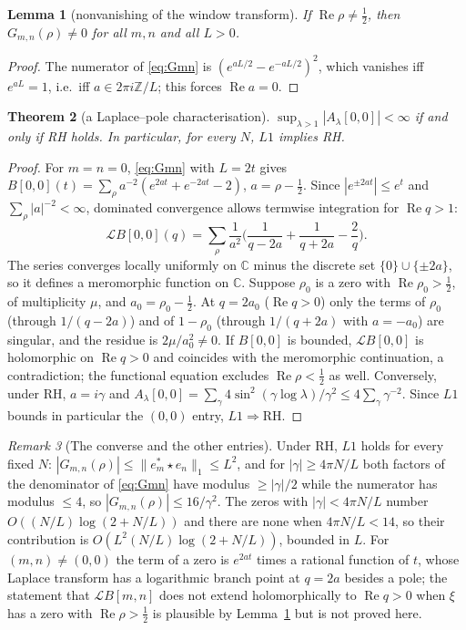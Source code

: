 \documentclass[11pt]{amsart}
\newtheorem{theorem}{Theorem}[section]
\newtheorem{lemma}[theorem]{Lemma}
\theoremstyle{definition}
\theoremstyle{remark}
\newtheorem{remark}[theorem]{Remark}
\newcommand{\RH}{\mathrm{RH}}
\renewcommand{\Re}{\operatorname{Re}}
\newcommand{\half}{\tfrac{1}{2}}
\newcommand{\gam}{\gamma}
\newcommand{\Z}{\mathbb{Z}}
\newcommand{\C}{\mathbb{C}}
\begin{document}
\begin{lemma}[nonvanishing of the window transform]\label{lem:pw}
If $\Re\rho\neq\half$, then $G_{m,n}(\rho)\neq0$ for all $m,n$ and all $L>0$.
\end{lemma}
\begin{proof}
The numerator of \eqref{eq:Gmn} is $(e^{aL/2}-e^{-aL/2})^2$, which vanishes iff $e^{aL}=1$, i.e.\
iff $a\in2\pi i\Z/L$; this forces $\Re a=0$.
\end{proof}

\begin{theorem}[a Laplace--pole characterisation]\label{thm:L1}
$\sup_{\lambda>1}|A_\lambda[0,0]|<\infty$ if and only if RH holds. In particular, for every $N$,
$L1$ implies RH.
\end{theorem}
\begin{proof}
For $m=n=0$, \eqref{eq:Gmn} with $L=2t$ gives
$B[0,0](t)=\sum_\rho a^{-2}(e^{2at}+e^{-2at}-2)$, $a=\rho-\half$. Since $|e^{\pm2at}|\le e^t$ and
$\sum_\rho|a|^{-2}<\infty$, dominated convergence allows termwise integration for $\Re q>1$:
\[
   \mathcal LB[0,0](q)=\sum_\rho\frac1{a^2}\Big(\frac1{q-2a}+\frac1{q+2a}-\frac2q\Big).
\]
The series converges locally uniformly on $\C$ minus the discrete set $\{0\}\cup\{\pm2a\}$, so it
defines a meromorphic function on $\C$. Suppose $\rho_0$ is a zero with $\Re\rho_0>\half$, of
multiplicity $\mu$, and $a_0=\rho_0-\half$. At $q=2a_0$ ($\Re q>0$) only the terms of $\rho_0$
(through $1/(q-2a)$) and of $1-\rho_0$ (through $1/(q+2a)$ with $a=-a_0$) are singular, and the
residue is $2\mu/a_0^2\neq0$. If $B[0,0]$ is bounded, $\mathcal LB[0,0]$ is holomorphic on
$\Re q>0$ and coincides with the meromorphic continuation, a contradiction; the functional
equation excludes $\Re\rho<\half$ as well. Conversely, under RH, $a=i\gam$ and
$A_\lambda[0,0]=\sum_\gam4\sin^2(\gam\log\lambda)/\gam^2\le4\sum_\gam\gam^{-2}$. Since $L1$ bounds
in particular the $(0,0)$ entry, $L1\Rightarrow\RH$.
\end{proof}

\begin{remark}[The converse and the other entries]\label{rem:converse}
Under RH, $L1$ holds for every fixed $N$: $|G_{m,n}(\rho)|\le\|e_m^*\star e_n\|_1\le L^2$, and for
$|\gam|\ge4\pi N/L$ both factors of the denominator of \eqref{eq:Gmn} have modulus $\ge|\gam|/2$
while the numerator has modulus $\le4$, so $|G_{m,n}(\rho)|\le16/\gam^2$. The zeros with
$|\gam|<4\pi N/L$ number $O((N/L)\log(2+N/L))$ and there are none when $4\pi N/L<14$, so their
contribution is $O(L^2(N/L)\log(2+N/L))$, bounded in $L$. For $(m,n)\neq(0,0)$ the term of a zero is
$e^{2at}$ times a rational function of $t$, whose Laplace transform has a logarithmic branch point at
$q=2a$ besides a pole; the statement that $\mathcal LB[m,n]$ does not extend holomorphically to
$\Re q>0$ when $\xi$ has a zero with $\Re\rho>\half$ is plausible by Lemma~\ref{lem:pw} but is not
proved here.
\end{remark}
\end{document}
